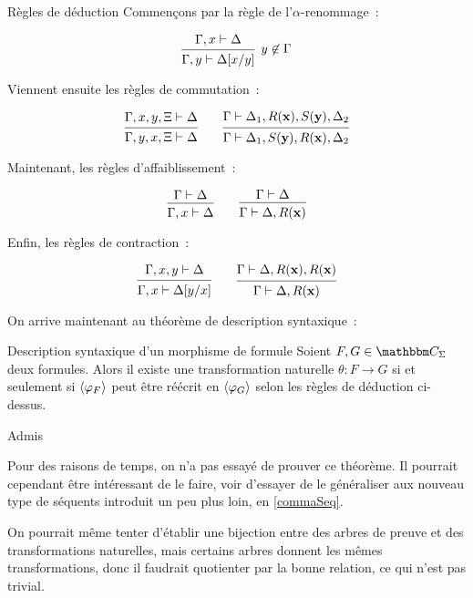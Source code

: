 \begin{defi}{Règles de déduction}
    Commençons par la règle de l'$\alpha$-renommage~:

    \[ \tproof{ \hypo{\Gamma, x\vdash \Delta}
         \infer1[$y\not\in\Gamma$]{\Gamma, y\vdash \Delta[x/y]} }\]

    Viennent ensuite les règles de commutation~:

    \[ \tproof{ \hypo{\Gamma, x, y, \Xi\vdash \Delta}
         \infer1{\Gamma, y, x, \Xi\vdash \Delta} }
       \qquad
       \tproof{ \hypo{\Gamma\vdash \Delta_1, R(\mathbf{x}), S(\mathbf{y}), \Delta_2}
         \infer1{\Gamma\vdash \Delta_1, S(\mathbf{y}), R(\mathbf{x}), \Delta_2} }
    \]

    Maintenant, les règles d'affaiblissement~:

    \[ \tproof{ \hypo{\Gamma\vdash\Delta}
         \infer1{\Gamma, x\vdash \Delta} }
       \qquad
       \tproof{ \hypo{\Gamma\vdash\Delta}
         \infer1{\Gamma\vdash\Delta,R(\mathbf{x})} }\]

    Enfin, les règles de contraction~:

    \[ \tproof{ \hypo{\Gamma,x,y\vdash\Delta}
         \infer1{\Gamma, x\vdash\Delta[y/x]} }
       \qquad
       \tproof{ \hypo{\Gamma\vdash\Delta, R(\mathbf{x}), R(\mathbf{x})}
         \infer1{\Gamma\vdash\Delta, R(\mathbf{x})} }\]

\end{defi}

On arrive maintenant au théorème de description syntaxique~:

\begin{theo}{Description syntaxique d'un morphisme de formule}
    Soient $F,G\in\C_\Sigma$ deux formules. Alors il existe une transformation
    naturelle $\theta:F\rightarrow G$ si et seulement si $\langle{\varphi_F}\rangle$ peut être réécrit
    en $\langle{\varphi_G}\rangle$ selon les règles de déduction ci-dessus.
\end{theo}

\begin{pv}
    Admis
\end{pv}

Pour des raisons de temps, on n'a pas essayé de prouver ce théorème. Il pourrait
cependant être intéressant de le faire, voir d'essayer de le généraliser aux nouveau
type de séquents introduit un peu plus loin, en \ref{commaSeq}.

\begin{rem}
    On pourrait même tenter d'établir une bijection entre des arbres de preuve
    et des transformations naturelles, mais certains arbres donnent les mêmes
    transformations, donc il faudrait quotienter par la bonne relation, ce qui
    n'est pas trivial.
\end{rem}

